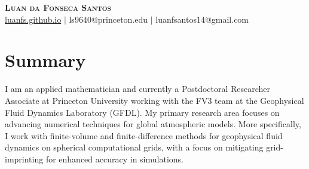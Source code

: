 \documentclass[letterpaper,11pt]{article}
\begin{document}

\begin{center}
    \textbf{\Huge \scshape Luan da Fonseca Santos} \\ \vspace{1pt}
    \href{https://luanfs.github.io}{luanfs.github.io} $|$
    ls9640@princeton.edu
    $|$  
    {luanfsantos14@gmail.com} 
\end{center}

\section{Summary}
I am an applied mathematician and currently a Postdoctoral Researcher Associate at Princeton University working with the FV3 team at the Geophysical Fluid Dynamics Laboratory (GFDL).
My primary research area focuses on advancing numerical techniques for global atmospheric models.
More specifically, I work with finite-volume and finite-difference methods for geophysical fluid dynamics on spherical computational grids, with a focus on mitigating grid-imprinting for enhanced accuracy in simulations.


\end{document}
